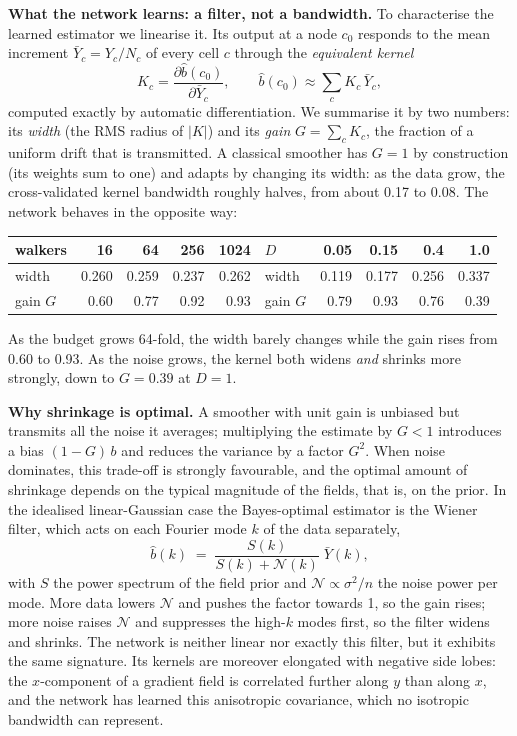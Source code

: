 \documentclass[11pt,a4paper]{article}
\begin{document}
\textbf{What the network learns: a filter, not a bandwidth.} To characterise the learned
estimator we linearise it. Its output at a node $c_0$ responds to the mean increment
$\bar Y_c=Y_c/N_c$ of every cell $c$ through the \emph{equivalent kernel}
\begin{equation}
  K_c = \frac{\partial \hat b(c_0)}{\partial \bar Y_c},
  \qquad
  \hat b(c_0) \approx \sum_c K_c\,\bar Y_c ,
\end{equation}
computed exactly by automatic differentiation. We summarise it by two numbers: its
\emph{width} (the RMS radius of $|K|$) and its \emph{gain} $G=\sum_c K_c$, the fraction of a
uniform drift that is transmitted. A classical smoother has $G=1$ by construction (its weights
sum to one) and adapts by changing its width: as the data grow, the cross-validated kernel
bandwidth roughly halves, from about 0.17 to 0.08. The network behaves in the opposite way:

\begin{center}
\small
\begin{tabular}{@{}lrrrr@{\qquad}lrrrr@{}}
\toprule
walkers & 16 & 64 & 256 & 1024 & $D$ & 0.05 & 0.15 & 0.4 & 1.0 \\
\midrule
width & 0.260 & 0.259 & 0.237 & 0.262 & width & 0.119 & 0.177 & 0.256 & 0.337 \\
gain $G$ & 0.60 & 0.77 & 0.92 & 0.93 & gain $G$ & 0.79 & 0.93 & 0.76 & 0.39 \\
\bottomrule
\end{tabular}
\end{center}

As the budget grows 64-fold, the width barely changes while the gain rises from 0.60 to
0.93. As the noise grows, the kernel both widens \emph{and} shrinks more strongly, down to
$G=0.39$ at $D=1$.

\textbf{Why shrinkage is optimal.} A smoother with unit gain is unbiased but transmits all
the noise it averages; multiplying the estimate by $G<1$ introduces a bias $(1-G)\,b$ and
reduces the variance by a factor $G^2$. When noise dominates, this trade-off is strongly
favourable, and the optimal amount of shrinkage depends on the typical magnitude of the
fields, that is, on the prior. In the idealised linear-Gaussian case the Bayes-optimal estimator is the Wiener filter,
which acts on each Fourier mode $k$ of the data separately,
\begin{equation}
  \hat b(k) \;=\; \frac{S(k)}{S(k)+\mathcal N(k)}\;\bar Y(k),
\end{equation}
with $S$ the power spectrum of the field prior and $\mathcal N\propto\sigma^2/n$ the noise
power per mode. More data lowers $\mathcal N$ and pushes the factor towards 1, so the gain
rises; more noise raises $\mathcal N$ and suppresses the high-$k$ modes first, so the filter
widens and shrinks. The network is neither linear nor exactly this filter, but it exhibits the
same signature. Its kernels are moreover elongated with negative side lobes: the
$x$-component of a gradient field is correlated further along $y$ than along $x$, and the
network has learned this anisotropic covariance, which no isotropic bandwidth can represent.
\end{document}
